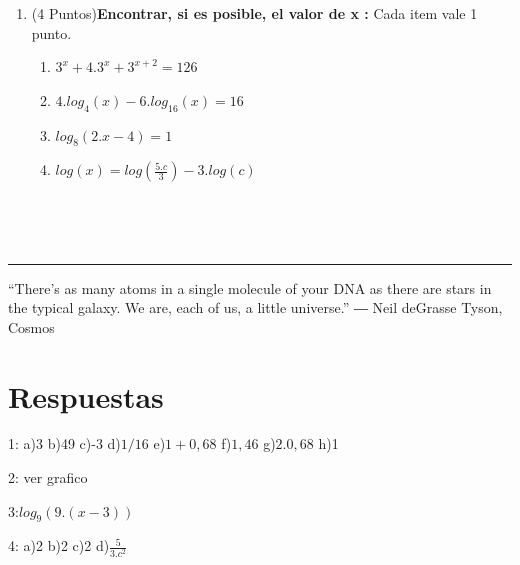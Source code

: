 \documentclass[a4paper]{exam}
\begin{document}
\begin{enumerate}
\begin{enumerate}
\end{enumerate}

\item (4 Puntos)\textbf{Encontrar, si es posible, el valor de x :}
Cada item vale 1 punto.
\begin{enumerate}
\item $3^x+4.3^x+3^{x+2}=126$
\item $4.log_4(x)-6.log_{16}(x)=16 $
\item $log_8(2.x-4)=1$
\item $log(x)=log(\frac{5.c}{3})-3.log(c)$
\end{enumerate}
 \\
\end{enumerate}
 \\
 \rule[2ex]{\textwidth}{2pt}
 
“There’s as many atoms in a single molecule of your DNA as there are stars in the typical galaxy. We are, each of us, a little universe.”
― Neil deGrasse Tyson, Cosmos 


%
%

\newpage

\section*{Respuestas}
1: a)3 b)49 c)-3 d)$ 1/16$ e)$ 1+0,68 $ f)$ 1,46$ g)$2.0,68$ h)1

2: ver grafico

3:$log_9(9.(x-3))$

4: a)2  b)2 c)2 d)$\frac{5}{3.c^2}$
\end{document}
